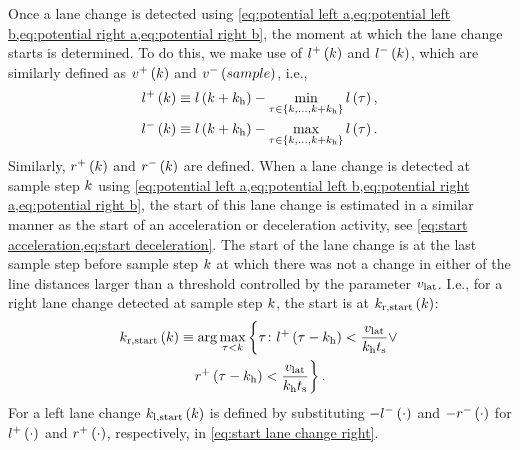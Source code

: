 Once a lane change is detected using \cref{eq:potential left a,eq:potential left b,eq:potential right a,eq:potential right b}, the moment at which the lane change starts is determined. To do this, we make use of $l^{+}\left(k\right)$ and $l^{-}\left(k\right)$, which are similarly defined as $v^{+}\left(k\right)$ and $v^{-}\left(sample\right)$, i.e.,
\begin{align}
	l^{+}\left(k\right) \equiv l\left(k+k_{\mathrm{h}}\right) - \min_{\tau \in \left\{k, \ldots, k+k_{\mathrm{h}}\right\}} l\left(\tau\right),\\
	l^{-}\left(k\right) \equiv l\left(k+k_{\mathrm{h}}\right) - \max_{\tau \in \left\{k, \ldots, k+k_{\mathrm{h}}\right\}} l\left(\tau\right).
\end{align}
Similarly, $r^{+}\left(k\right)$ and $r^{-}\left(k\right)$ are defined. 
When a lane change is detected at sample step $k$ using \cref{eq:potential left a,eq:potential left b,eq:potential right a,eq:potential right b}, the start of this lane change is estimated in a similar manner as the start of an acceleration or deceleration activity, see \cref{eq:start acceleration,eq:start deceleration}. 
The start of the lane change is at the last sample step before sample step $k$ at which there was not a change in either of the line distances larger than a threshold controlled by the parameter $v_{\mathrm{lat}}$. 
I.e., for a right lane change detected at sample step $k$, the start is at $k_\mathrm{r,start}\left(k\right)$:
\begin{multline} \label{eq:start lane change right}
	k_\mathrm{r,start}\left(k\right) \equiv \arg \max_{\tau < k} \left\{ \tau\colon l^{+}\left(\tau-k_{\mathrm{h}}\right) < \frac{v_{\mathrm{lat}}}{k_{\mathrm{h}}t_\mathrm{s}} \lor \right.\\
	\left. r^{+}\left(\tau-k_{\mathrm{h}}\right) < \frac{v_{\mathrm{lat}}}{k_{\mathrm{h}}t_\mathrm{s}} \right\}.
\end{multline}
For a left lane change $k_\mathrm{l,start}\left(k\right)$ is defined by substituting $-l^{-}\left(\cdot\right)$ and $-r^{-}\left(\cdot\right)$ for $l^{+}\left(\cdot\right)$ and $r^{+}\left(\cdot\right)$, respectively, in \cref{eq:start lane change right}.

